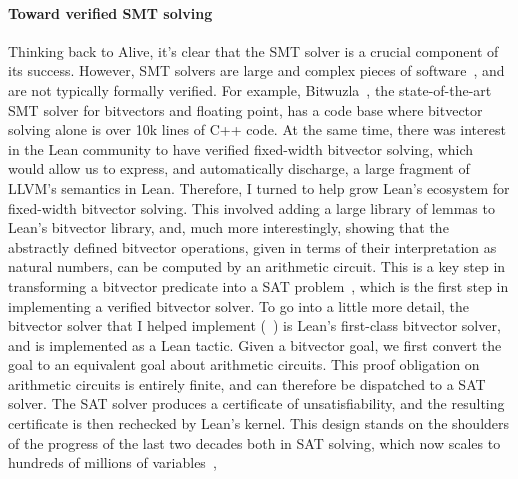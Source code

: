 \paragraph{Toward verified SMT solving}
Thinking back to Alive, it's clear that the SMT solver is a crucial component of its success.
However, SMT solvers are large and complex pieces of software~\citep{de2008z3,barbosa2022cvc5}, and are not typically formally verified.
For example, Bitwuzla~\citep{niemetz2023bitwuzla}, the state-of-the-art SMT solver for bitvectors and floating point,
has a code base where bitvector solving alone is over 10k lines of C++ code.
At the same time, there was interest in the Lean community to have verified 
fixed-width bitvector solving, which would allow us to express, and automatically discharge,
a large fragment of LLVM's semantics in Lean.
Therefore, I turned to help grow Lean's ecosystem for fixed-width bitvector solving.
This involved adding a large library of lemmas to Lean's bitvector library,
and, much more interestingly, showing that the abstractly defined bitvector operations, given in terms of their 
interpretation as natural numbers, can be computed by an arithmetic circuit.
This is a key step in transforming a bitvector predicate into a SAT problem~\citep{kroening2016decision},
which is the first step in implementing a verified bitvector solver.
To go into a little more detail, the bitvector solver that I helped implement (\bvdecide{}~\citep{leanbv})
is Lean's first-class bitvector solver, and is implemented as a Lean tactic.
Given a bitvector goal, we first convert the goal to an equivalent goal about arithmetic circuits.
This proof obligation on arithmetic circuits is entirely finite, and can therefore be dispatched to a SAT solver.
The SAT solver produces a certificate of unsatisfiability, and the resulting certificate is then rechecked by Lean's kernel.
This design stands on the shoulders of the progress of the last two decades
both in SAT solving, which now scales to hundreds of millions of variables~\citep{biere2024cadical,kissatSATComp2024},
